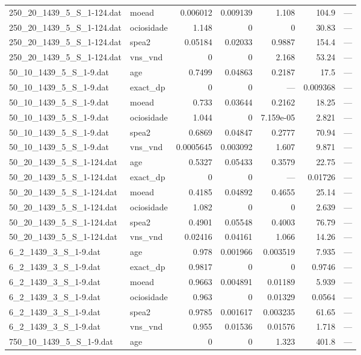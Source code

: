 \begin{tabular}{llrrrrr}
250\_20\_1439\_5\_S\_1-124.dat & moead & 0.006012 & 0.009139 & 1.108 & 104.9 & — \\
250\_20\_1439\_5\_S\_1-124.dat & ociosidade & 1.148 & 0 & 0 & 30.83 & — \\
250\_20\_1439\_5\_S\_1-124.dat & spea2 & 0.05184 & 0.02033 & 0.9887 & 154.4 & — \\
250\_20\_1439\_5\_S\_1-124.dat & vns\_vnd & 0 & 0 & 2.168 & 53.24 & — \\
50\_10\_1439\_5\_S\_1-9.dat & age & 0.7499 & 0.04863 & 0.2187 & 17.5 & — \\
50\_10\_1439\_5\_S\_1-9.dat & exact\_dp & 0 & 0 & — & 0.009368 & — \\
50\_10\_1439\_5\_S\_1-9.dat & moead & 0.733 & 0.03644 & 0.2162 & 18.25 & — \\
50\_10\_1439\_5\_S\_1-9.dat & ociosidade & 1.044 & 0 & 7.159e-05 & 2.821 & — \\
50\_10\_1439\_5\_S\_1-9.dat & spea2 & 0.6869 & 0.04847 & 0.2777 & 70.94 & — \\
50\_10\_1439\_5\_S\_1-9.dat & vns\_vnd & 0.0005645 & 0.003092 & 1.607 & 9.871 & — \\
50\_20\_1439\_5\_S\_1-124.dat & age & 0.5327 & 0.05433 & 0.3579 & 22.75 & — \\
50\_20\_1439\_5\_S\_1-124.dat & exact\_dp & 0 & 0 & — & 0.01726 & — \\
50\_20\_1439\_5\_S\_1-124.dat & moead & 0.4185 & 0.04892 & 0.4655 & 25.14 & — \\
50\_20\_1439\_5\_S\_1-124.dat & ociosidade & 1.082 & 0 & 0 & 2.639 & — \\
50\_20\_1439\_5\_S\_1-124.dat & spea2 & 0.4901 & 0.05548 & 0.4003 & 76.79 & — \\
50\_20\_1439\_5\_S\_1-124.dat & vns\_vnd & 0.02416 & 0.04161 & 1.066 & 14.26 & — \\
6\_2\_1439\_3\_S\_1-9.dat & age & 0.978 & 0.001966 & 0.003519 & 7.935 & — \\
6\_2\_1439\_3\_S\_1-9.dat & exact\_dp & 0.9817 & 0 & 0 & 0.9746 & — \\
6\_2\_1439\_3\_S\_1-9.dat & moead & 0.9663 & 0.004891 & 0.01189 & 5.939 & — \\
6\_2\_1439\_3\_S\_1-9.dat & ociosidade & 0.963 & 0 & 0.01329 & 0.0564 & — \\
6\_2\_1439\_3\_S\_1-9.dat & spea2 & 0.9785 & 0.001617 & 0.003235 & 61.65 & — \\
6\_2\_1439\_3\_S\_1-9.dat & vns\_vnd & 0.955 & 0.01536 & 0.01576 & 1.718 & — \\
750\_10\_1439\_5\_S\_1-9.dat & age & 0 & 0 & 1.323 & 401.8 & — \\

\end{tabular}
